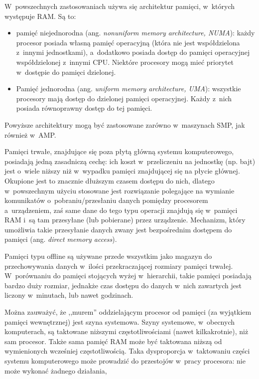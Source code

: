 \documentclass[12pt,makeidx]{mwart}
\begin{document}
\par
%
\indent
	W~powszechnych zastosowaniach używa się architektur pamięci, w~których występuje RAM. Są to:
	\begin{itemize}
		\item pamięć niejednorodna (ang. \emph{non\dywiz uniform memory architecture, NUMA}): każdy procesor posiada własną pamięć operacyjną
			(która nie jest współdzielona z~innymi jednostkami), a~dodatkowo posiada dostęp do pamięci operacyjnej współdzielonej z~innymi CPU.
			Niektóre procesory mogą mieć priorytet w~dostępie do pamięci dzielonej.
		\item Pamięć jednorodna (ang. \emph{uniform memory architecture, UMA}): wszystkie procesory mają dostęp do dzielonej pamięci operacyjnej.
			Każdy z~nich posiada równoprawny dostęp do tej pamięci.
	\end{itemize}
	Powyższe architektury mogą być zastosowane zarówno w~maszynach SMP, jak również w~AMP.
\par
%
\indent
	Pamięci trwałe, znajdujące się poza płytą główną systemu komputerowego, posiadają jedną zasadniczą cechę: ich koszt w~przeliczeniu na jednostkę
	(np. bajt) jest o~wiele niższy niż w~wypadku pamięci znajdującej się na płycie głównej. Okupione jest to znacznie dłuższym czasem dostępu 
	do nich, dlatego w~powszechnym użyciu stosowane jest rozwiązanie polegające na wymianie komunikatów o~pobraniu/przesłaniu danych pomiędzy
	procesorem a~urządzeniem, zaś same dane do tego typu operacji znajdują się w~pamięci RAM i~są tam przesyłane (lub pobierane) przez urządzenie.
	Mechanizm, który umożliwia takie przesyłanie danych zwany jest bezpośrednim dostępem do pamięci (ang. \emph{direct memory access}).
\par
%
\indent
	Pamięci typu off\dywiz line są używane przede wszystkim jako magazyn do przechowywania danych w~ilości przekraczającej rozmiary pamięci trwałej.
	W~porównaniu do pamięci stojących wyżej w~hierarchii, takie pamięci posiadają bardzo duży rozmiar, jednakże czas dostępu do danych w~nich
	zawartych jest liczony w~minutach, lub nawet godzinach.
\par
%
\indent
	Można zauważyć, że ,,murem'' oddzielającym procesor od pamięci (za wyjątkiem pamięci wewnętrznej) jest szyna systemowa.
	Szyny systemowe, w~obecnych komputerach, są taktowane niższymi częstotliwościami (nawet kilkakrotnie), niż sam procesor.
	Także sama pamięć RAM może być taktowana niższą od wymienionych wcześniej częstotliwością.
	Taka dysproporcja w~taktowaniu części systemu komputerowego może prowadzić do przestojów w~pracy procesora: nie może wykonać żadnego działania,
\end{document}
